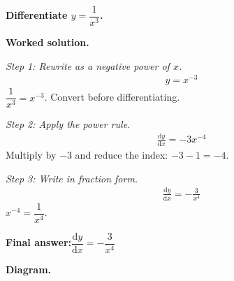 \documentclass[11pt]{article}
\newcommand{\question}[1]{\par\medskip\noindent\textbf{#1}\par}
\begin{document}
\question{Differentiate \( y = \dfrac{1}{x^3} \).}

\textbf{Worked solution.}

\textit{Step 1: Rewrite as a negative power of \( x \).}
\[\begin{gathered}
y = x^{-3}
\end{gathered}\]
\( \dfrac{1}{x^3} = x^{-3} \). Convert before differentiating.

\textit{Step 2: Apply the power rule.}
\[\begin{gathered}
\frac{\mathrm{d}y}{\mathrm{d}x} = -3x^{-4}
\end{gathered}\]
Multiply by \(-3\) and reduce the index: \(-3 - 1 = -4\).

\textit{Step 3: Write in fraction form.}
\[\begin{gathered}
\frac{\mathrm{d}y}{\mathrm{d}x} = -\frac{3}{x^4}
\end{gathered}\]
\( x^{-4} = \dfrac{1}{x^4} \).

\begin{answerbox}
\textbf{Final answer:}\quad \(\displaystyle  \dfrac{\mathrm{d}y}{\mathrm{d}x} = -\dfrac{3}{x^4} \)
\end{answerbox}
\textbf{Diagram.}
\end{document}
